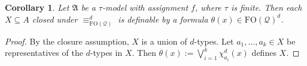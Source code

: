 \documentclass{article}
\newtheorem{corollary}[theorem]{Corollary}
\theoremstyle{definition}
\begin{document}
\begin{corollary}\label{cor:closed-definable}
    Let $\mathfrak{A}$ be a $\tau$-model with assignment $f$, where $\tau$ is finite. Then each $X\subseteq A$ closed under $\equiv^d_{\mathrm{FO}(\mathcal{Q})}$ is definable by a formula $\theta(x)\in\mathrm{FO}(\mathcal{Q})^d$.
\end{corollary}
\begin{proof}
    By the closure assumption, $X$ is a union of $d$-types. Let $a_1,\dots,a_k\in X$ be representatives of the $d$-types in $X$. Then $\theta(x):=\bigvee^k_{i=1}\chi^d_{a_i}(x)$ defines $X$.
\end{proof}




\end{document}
